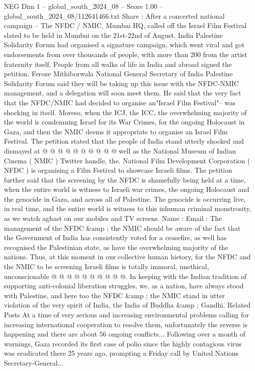 \begin{textsample}{NEG Dim 1 – global\_south\_2024\_08 – Score 1.00 – global\_south\_2024\_08/112641466.txt}  \label{ex:f1_neg_124}
Share : After a concerted national campaign -- The NFDC / NMIC, Mumbai HQ, called off the Israel Film Festival slated to be held in Mumbai on the 21st-22nd of August.
India Palestine Solidarity Forum had organised a signature campaign, which went viral and got endorsements from over thousands of people, with more than 200 from the artist fraternity itself.
People from all walks of life in India and abroad signed the petition.
Feroze Mithiborwala National General Secretary of India Palestine Solidarity Forum said they will be taking up this issue with the NFDC-NMIC management, and a delegation will soon meet them.
He said that the very fact that the NFDC/NMIC had decided to organise an"Israel Film Festival"-- was shocking in itself.
Moreso, when the ICJ, the ICC, the overwhelming majority of the world is condemning Israel for its War Crimes, for the ongoing Holocaust in Gaza, and then the NMIC deems it appropriate to organise an Israel Film Festival.
The petition stated that the people of India stand utterly shocked and dismayed at @ @ @ @ @ @ @ @ @ @ well as the National Museum of Indian Cinema ( NMIC ) Twitter handle, the.
National Film Development Corporation ( NFDC ) is organising a Film Festival to showcase Israeli films.
The petition further said that the screening by the NFDC is shamefully being held at a time, when the entire world is witness to Israeli war crimes, the ongoing Holocaust and the genocide in Gaza, and across all of Palestine.
The genocide is occurring live, in real time, and the entire world is witness to this inhuman criminal monstrosity, as we watch aghast on our mobiles and TV screens.
Name : Email : The management of the NFDC \&amp ; the NMIC should be aware of the fact that the Government of India has consistently voted for a ceasefire, as well has recognised the Palestinian state, as have the overwhelming majority of the nations.
Thus, at this moment in our collective human history, for the NFDC and the NMIC to be screening Israeli films is totally immoral, unethical, unconscionable @ @ @ @ @ @ @ @ @ @.
In keeping with the Indian tradition of supporting anti-colonial liberation struggles, we, as a nation, have always stood with Palestine, and here too the NFDC \&amp ; the NMIC stand in utter violation of the very spirit of India, the India of Buddha \&amp ; Gandhi.
Related Posts At a time of very serious and increasing environmental problems calling for increasing international cooperation to resolve them, unfortunately the reverse is happening and there are about 56 ongoing conflicts...
Following over a month of warnings, Gaza recorded its first case of polio since the highly contagious virus was eradicated there 25 years ago, prompting a Friday call by United Nations Secretary-General...

\end{textsample}
